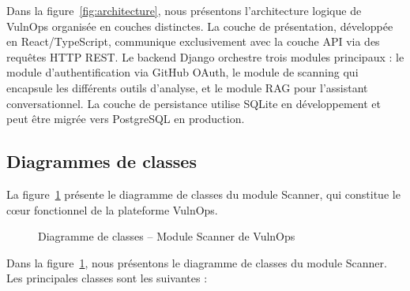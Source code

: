 \documentclass[12pt, a4paper, oneside]{report}
\begin{document}
Dans la figure~\ref{fig:architecture}, nous présentons l'architecture logique
de VulnOps organisée en couches distinctes. La couche de présentation, développée
en React/TypeScript, communique exclusivement avec la couche API via des requêtes
HTTP REST. Le backend Django orchestre trois modules principaux : le module
d'authentification via GitHub OAuth, le module de scanning qui encapsule les
différents outils d'analyse, et le module RAG pour l'assistant conversationnel.
La couche de persistance utilise SQLite en développement et peut être migrée
vers PostgreSQL en production.

\subsection{Diagrammes de classes}
\label{subsec:classes}

La figure~\ref{fig:classes_scanner} présente le diagramme de classes du module
Scanner, qui constitue le cœur fonctionnel de la plateforme VulnOps.

\begin{figure}[H]
    \centering
    \caption{Diagramme de classes -- Module Scanner de VulnOps}
    \label{fig:classes_scanner}
\end{figure}

Dans la figure~\ref{fig:classes_scanner}, nous présentons le diagramme de classes
du module Scanner. Les principales classes sont les suivantes :
\end{document}
